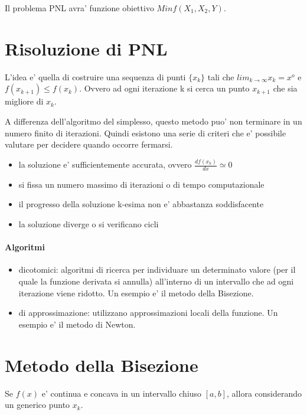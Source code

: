 Il problema PNL avra' funzione obiettivo $Min f(X_1,X_2,Y)$.

\section{Risoluzione di PNL}

L'idea e' quella di costruire una sequenza di punti $\{x_k\}$ tali che $lim _ {k \rightarrow \infty} x_k = x^o$
e $f(x_{k+1}) \leq f(x_k)$. Ovvero ad ogni iterazione k si cerca un punto $x_{k+1}$ che sia migliore di $x_k$.

A differenza dell'algoritmo del simplesso, questo metodo puo' non terminare in un numero finito di iterazioni.
Quindi esistono una serie di criteri che e' possibile valutare per decidere quando occorre fermarsi.

\begin{itemize}
    \item la soluzione e' sufficientemente accurata, ovvero $\frac {df(x_k)} {dx} \simeq0$
    \item si fissa un numero massimo di iterazioni o di tempo computazionale
    \item il progresso della soluzione k-esima non e' abbastanza soddisfacente
    \item la soluzione diverge o si verificano cicli
\end{itemize}

\paragraph{Algoritmi}

\begin{itemize}
    \item dicotomici: algoritmi di ricerca per individuare un determinato valore (per il quale la funzione derivata si annulla) all'interno di un intervallo che ad ogni iterazione viene ridotto. Un esempio e' il metodo della Bisezione.
    \item di approssimazione: utilizzano approssimazioni locali della funzione. Un esempio e' il metodo di Newton.
\end{itemize}

\section{Metodo della Bisezione}

Se $f(x)$ e' continua e concava in un intervallo chiuso $[a,b]$, allora considerando un generico punto $x_k$.

